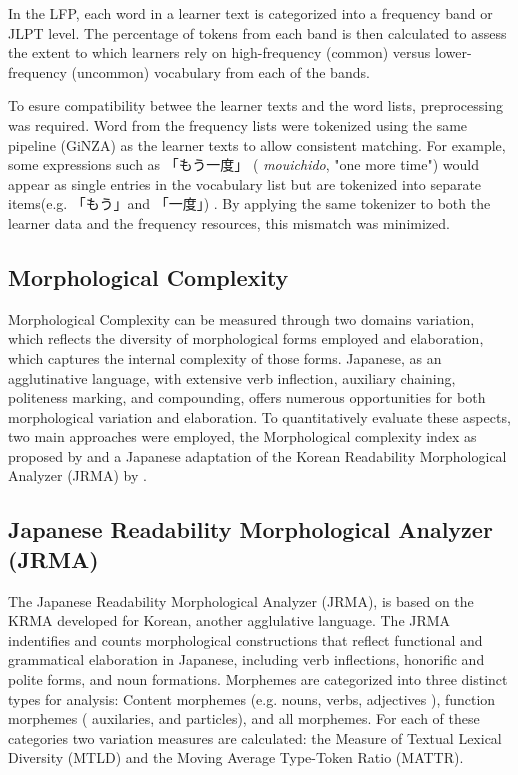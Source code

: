 In the LFP, each word in a learner text is categorized into a frequency band or JLPT level. The percentage of tokens
from each band is then calculated to assess the extent to which learners rely on high-frequency (common) versus
lower-frequency (uncommon) vocabulary  from
each of the bands.

To esure compatibility betwee the learner texts and the word lists, preprocessing was required. Word from the
frequency lists were tokenized using the same pipeline (GiNZA) as the learner texts to allow consistent matching.
 For example, some expressions such as
「もう一度」 (
\textit{mouichido}, "one more time") would appear as single entries in the vocabulary list but are tokenized
into separate
items(e.g. 「もう」and 「一度」) . By applying the same tokenizer to both the learner data and the frequency resources, this
mismatch was minimized.


\subsection{Morphological Complexity}
Morphological Complexity can be measured through two domains variation, which reflects the diversity of morphological
forms employed and
elaboration, which captures the internal complexity of those forms. Japanese, as an
agglutinative
language, with extensive verb inflection, auxiliary chaining, politeness marking, and compounding,
offers
numerous opportunities for both morphological variation and elaboration. To quantitatively evaluate these aspects, two
main
approaches were employed, the Morphological complexity index as proposed by
\citet{Brezina2019} and a Japanese adaptation of the Korean Readability Morphological Analyzer (JRMA) by
\citet{Hwang2024}.

\subsection{Japanese Readability Morphological Analyzer (JRMA)}

The Japanese Readability Morphological Analyzer (JRMA), is based on the KRMA developed for Korean, another
agglulative language. The JRMA indentifies and counts morphological constructions that reflect
functional and grammatical elaboration in Japanese, including verb inflections, honorific and polite forms, and noun
formations.
Morphemes
are categorized into three distinct types for analysis: Content morphemes (e.g. nouns, verbs, adjectives ),
function
morphemes (
auxilaries, and particles), and all morphemes. For each of these categories two variation measures are
calculated: the
Measure of Textual Lexical Diversity (MTLD) and the Moving Average Type-Token Ratio (MATTR).

